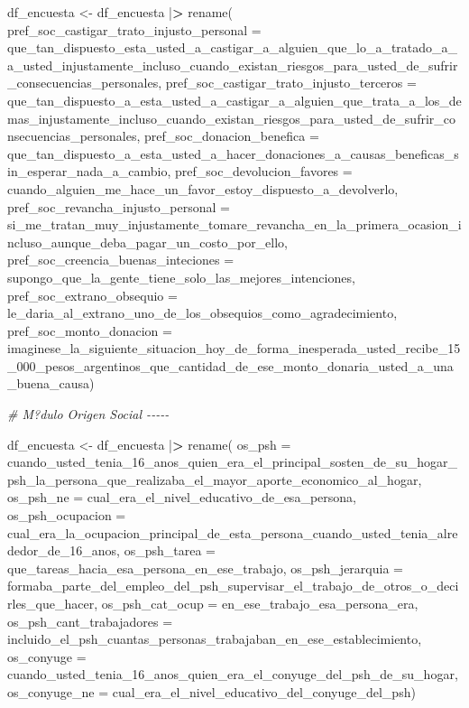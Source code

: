\documentclass[
]{book}
\newenvironment{Shaded}{\begin{snugshade}}{\end{snugshade}}
\newcommand{\AttributeTok}[1]{\textcolor[rgb]{0.77,0.63,0.00}{#1}}
\newcommand{\CommentTok}[1]{\textcolor[rgb]{0.56,0.35,0.01}{\textit{#1}}}
\newcommand{\ErrorTok}[1]{\textcolor[rgb]{0.64,0.00,0.00}{\textbf{#1}}}
\newcommand{\FunctionTok}[1]{\textcolor[rgb]{0.00,0.00,0.00}{#1}}
\newcommand{\NormalTok}[1]{#1}
\newcommand{\OtherTok}[1]{\textcolor[rgb]{0.56,0.35,0.01}{#1}}
\newcommand{\SpecialCharTok}[1]{\textcolor[rgb]{0.00,0.00,0.00}{#1}}
\theoremstyle{definition}
\theoremstyle{definition}
\theoremstyle{definition}
\theoremstyle{definition}
\theoremstyle{remark}
\begin{document}
\begin{Shaded}
\begin{Highlighting}[]
\NormalTok{df\_encuesta }\OtherTok{\textless{}{-}}\NormalTok{ df\_encuesta }\SpecialCharTok{|}\ErrorTok{\textgreater{}}
\FunctionTok{rename}\NormalTok{(}
\AttributeTok{pref\_soc\_castigar\_trato\_injusto\_personal =}\NormalTok{ que\_tan\_dispuesto\_esta\_usted\_a\_castigar\_a\_alguien\_que\_lo\_a\_tratado\_a\_a\_usted\_injustamente\_incluso\_cuando\_existan\_riesgos\_para\_usted\_de\_sufrir\_consecuencias\_personales,}
\AttributeTok{pref\_soc\_castigar\_trato\_injusto\_terceros =}\NormalTok{ que\_tan\_dispuesto\_a\_esta\_usted\_a\_castigar\_a\_alguien\_que\_trata\_a\_los\_demas\_injustamente\_incluso\_cuando\_existan\_riesgos\_para\_usted\_de\_sufrir\_consecuencias\_personales,}
\AttributeTok{pref\_soc\_donacion\_benefica =}\NormalTok{ que\_tan\_dispuesto\_a\_esta\_usted\_a\_hacer\_donaciones\_a\_causas\_beneficas\_sin\_esperar\_nada\_a\_cambio,}
\AttributeTok{pref\_soc\_devolucion\_favores =}\NormalTok{ cuando\_alguien\_me\_hace\_un\_favor\_estoy\_dispuesto\_a\_devolverlo,}
\AttributeTok{pref\_soc\_revancha\_injusto\_personal =}\NormalTok{ si\_me\_tratan\_muy\_injustamente\_tomare\_revancha\_en\_la\_primera\_ocasion\_incluso\_aunque\_deba\_pagar\_un\_costo\_por\_ello,}
\AttributeTok{pref\_soc\_creencia\_buenas\_inteciones =}\NormalTok{ supongo\_que\_la\_gente\_tiene\_solo\_las\_mejores\_intenciones,}
\AttributeTok{pref\_soc\_extrano\_obsequio =}\NormalTok{ le\_daria\_al\_extrano\_uno\_de\_los\_obsequios\_como\_agradecimiento,}
\AttributeTok{pref\_soc\_monto\_donacion =}\NormalTok{ imaginese\_la\_siguiente\_situacion\_hoy\_de\_forma\_inesperada\_usted\_recibe\_15\_000\_pesos\_argentinos\_que\_cantidad\_de\_ese\_monto\_donaria\_usted\_a\_una\_buena\_causa)}

\CommentTok{\# M?dulo Origen Social {-}{-}{-}{-}{-}}

\NormalTok{df\_encuesta }\OtherTok{\textless{}{-}}\NormalTok{ df\_encuesta }\SpecialCharTok{|}\ErrorTok{\textgreater{}}
\FunctionTok{rename}\NormalTok{(}
\AttributeTok{os\_psh =}\NormalTok{ cuando\_usted\_tenia\_16\_anos\_quien\_era\_el\_principal\_sosten\_de\_su\_hogar\_psh\_la\_persona\_que\_realizaba\_el\_mayor\_aporte\_economico\_al\_hogar,}
\AttributeTok{os\_psh\_ne =}\NormalTok{ cual\_era\_el\_nivel\_educativo\_de\_esa\_persona,}
\AttributeTok{os\_psh\_ocupacion =}\NormalTok{ cual\_era\_la\_ocupacion\_principal\_de\_esta\_persona\_cuando\_usted\_tenia\_alrededor\_de\_16\_anos,}
\AttributeTok{os\_psh\_tarea =}\NormalTok{ que\_tareas\_hacia\_esa\_persona\_en\_ese\_trabajo,}
\AttributeTok{os\_psh\_jerarquia =}\NormalTok{ formaba\_parte\_del\_empleo\_del\_psh\_supervisar\_el\_trabajo\_de\_otros\_o\_decirles\_que\_hacer,}
\AttributeTok{os\_psh\_cat\_ocup =}\NormalTok{ en\_ese\_trabajo\_esa\_persona\_era,}
\AttributeTok{os\_psh\_cant\_trabajadores =}\NormalTok{ incluido\_el\_psh\_cuantas\_personas\_trabajaban\_en\_ese\_establecimiento,}
\AttributeTok{os\_conyuge =}\NormalTok{ cuando\_usted\_tenia\_16\_anos\_quien\_era\_el\_conyuge\_del\_psh\_de\_su\_hogar,}
\AttributeTok{os\_conyuge\_ne =}\NormalTok{ cual\_era\_el\_nivel\_educativo\_del\_conyuge\_del\_psh)}


\end{Highlighting}
\end{Shaded}
\end{document}
